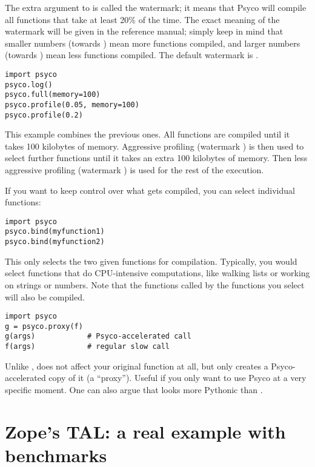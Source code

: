 \documentclass{manual}
\begin{document}
The extra argument  to  is called the watermark; it means that Psyco will compile all functions that take at least 20\% of the time.  The exact meaning of the watermark will be given in the reference manual; simply keep in mind that smaller numbers (towards ) mean more functions compiled, and larger numbers (towards ) mean less functions compiled.  The default watermark is .

\begin{verbatim}
import psyco
psyco.log()
psyco.full(memory=100)
psyco.profile(0.05, memory=100)
psyco.profile(0.2)
\end{verbatim}

This example combines the previous ones.  All functions are compiled until it takes 100 kilobytes of memory.  Aggressive profiling (watermark ) is then used to select further functions until it takes an extra 100 kilobytes of memory.  Then less aggressive profiling (watermark ) is used for the rest of the execution.  

If you want to keep control over what gets compiled, you can select individual functions:

\begin{verbatim}
import psyco
psyco.bind(myfunction1)
psyco.bind(myfunction2)
\end{verbatim}

This only selects the two given functions for compilation. Typically, you would select functions that do CPU-intensive computations, like walking lists or working on strings or numbers.  Note that the functions called by the functions you select will also be compiled.

\begin{verbatim}
import psyco
g = psyco.proxy(f)
g(args)            # Psyco-accelerated call
f(args)            # regular slow call
\end{verbatim}

Unlike ,  does not affect your original function at all, but only creates a Psyco-accelerated copy of it (a ``proxy'').  Useful if you only want to use Psyco at a very specific moment.  One can also argue that  looks more Pythonic than .


\section{Zope's TAL: a real example with benchmarks}
\end{document}
